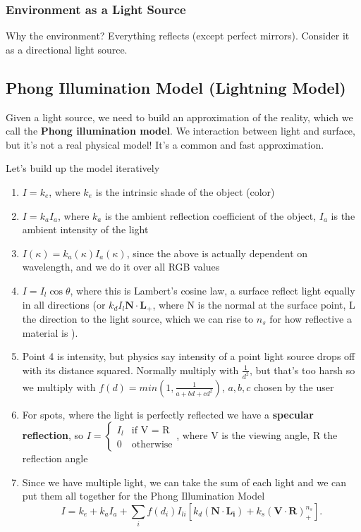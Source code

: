 \documentclass[11pt]{article}
\begin{document}
\subsubsection*{Environment as a Light Source}
Why the environment? Everything reflects (except perfect mirrors). Consider it as a directional light source.

\subsection{Phong Illumination Model (Lightning Model)}
Given a light source, we need to build an approximation of the reality, which we call the \textbf{Phong illumination model}. We interaction between light and surface, but it's not a real physical model! It's a common and fast approximation.

Let's build up the model iteratively

\begin{enumerate}
    \item $I = k_e$, where $k_e$ is the intrinsic shade of the object (color)  
    \item $I = k_a I_a$, where $k_a$ is the ambient reflection coefficient of the object, $I_a$ is the ambient intensity of the light   
    \item $I(\kappa) = k_a(\kappa) I_a(\kappa)$, since the above is actually dependent on wavelength, and we do it over all RGB values
    \item $I = I_l \cos \theta$, where this is Lambert's cosine law, a surface reflect light equally in all directions (or $k_dI_l\mathbf{N\cdot L}_+$, where N is the normal at the surface point, L the direction to the light source, which we can rise to $n_s$ for how reflective a material is ). 
    \item Point 4 is intensity, but physics say intensity of a point light source drops off with its distance squared. Normally multiply with $\frac{1}{d^2}$, but that's too harsh so we multiply with $f(d) = min(1, \frac{1}{a+bd+cd^2})$, $a,b,c$ chosen by the user
    \item For spots, where the light is perfectly reflected we have a \textbf{specular reflection}, so $I = \begin{cases}
        I_l & \text{if V = R}\\
        0 & \text{otherwise}
    \end{cases}$, where V is the viewing angle, R the reflection angle
    \item Since we have multiple light, we can take the sum of each light and we can put them all together for the Phong Illumination Model \[
    I = k_e + k_aI_a + \sum_{i} f(d_i) I_{li} [k_d(\mathbf{N\cdot L_i}) + k_s(\mathbf{V\cdot R})_+^{n_s}] 
    .\] 
\end{enumerate}
\end{document}
